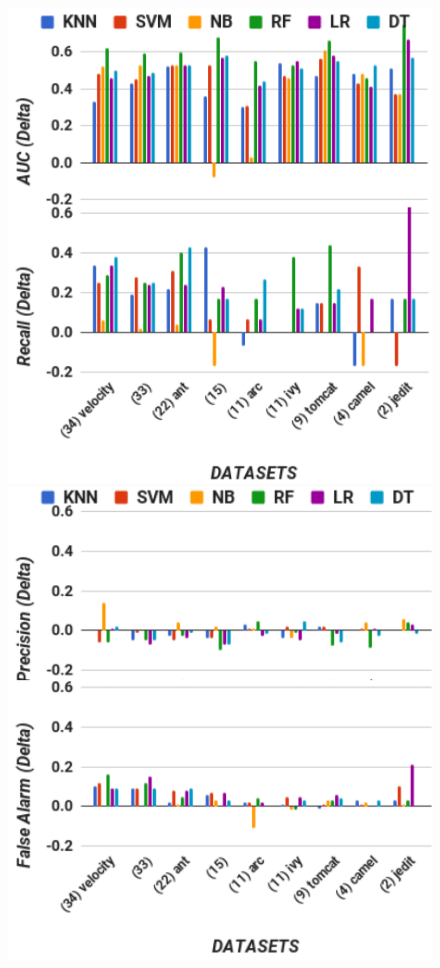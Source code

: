 \documentclass[sigconf,review, anonymous]{acmart}
\theoremstyle{break}
\theoremstyle{break}
\begin{document}
\begin{figure}[!t]
\begin{minipage}{.5\linewidth}
\centering
        \includegraphics[width=0.85\linewidth,keepaspectratio,trim=0cm 1cm 0cm 2cm]{./fig/AUC_recall_tuned.png}
    \end{minipage}%
\begin{minipage}{.5\linewidth}
        \centering
        \includegraphics[width=0.85\linewidth,keepaspectratio,trim=0cm 1cm 0cm 2cm]{./fig/prec_pf_tuned.png}
    \end{minipage}%
    

\end{figure}
\end{document}
